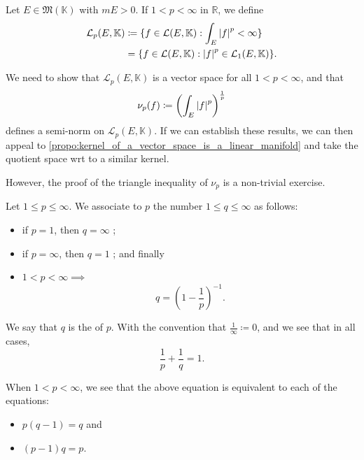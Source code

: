 \documentclass[notoc,notitlepage]{tufte-book}
\begin{document}
\begin{defn}\label{defn:_l_p_e_k_}
  Let $E \in \mathfrak{M}(\mathbb{K})$ with $mE > 0$. If $1 < p < \infty$ in
  $\mathbb{R}$, we define
  \begin{align*} 
    \mathcal{L}_p(E, \mathbb{K})
    &\coloneqq \{ f \in \mathcal{L}(E, \mathbb{K}) :
      \int_{E} \left|f\right|^p < \infty \} \\
    &= \{ f \in \mathcal{L}(E, \mathbb{K}) : \left|f\right|^p \in \mathcal{L}_1(E,
      \mathbb{K}) \}.
  \end{align*}
\end{defn}

We need to show that $\mathcal{L}_p(E, \mathbb{K})$ is a vector space for all $1
< p < \infty$, and that
\begin{equation*}
  \nu_p(f) \coloneqq \left( \int_{E} \left|f\right|^p \right)^{\frac{1}{p}}
\end{equation*}
defines a semi-norm on $\mathcal{L}_p(E, \mathbb{K})$. If we can establish these
results, we can then appeal to
\cref{propo:kernel_of_a_vector_space_is_a_linear_manifold} and take the quotient
space wrt to a similar kernel.

However, the proof of the triangle inequality of $\nu_p$ is a non-trivial
exercise.

\begin{defn}\label{defn:lebesgue_conjugate}
  Let $1 \leq p \leq \infty$. We associate to $p$ the number $1 \leq q \leq
  \infty$ as follows:
  \begin{itemize}
    \item if $p = 1$, then $q = \infty$ ;
    \item if $p = \infty$, then $q = 1$ ; and finally
    \item $1 < p < \infty \implies$ 
      \begin{equation*}
        q = \left( 1 - \frac{1}{p} \right)^{-1}.
      \end{equation*}
  \end{itemize}
  We say that $q$ is the  of $p$. With the
  convention that $\frac{1}{\infty} \coloneqq 0$, and we see that in all cases,
  \begin{equation*}
    \frac{1}{p} + \frac{1}{q} = 1.
  \end{equation*}
\end{defn}

\begin{note}
  When $1 < p < \infty$, we see that the above equation is equivalent to each of
  the equations:
  \begin{itemize}
    \item $p(q - 1) = q$ and
    \item $(p - 1)q = p$.
  \end{itemize}
\end{note}
\end{document}
